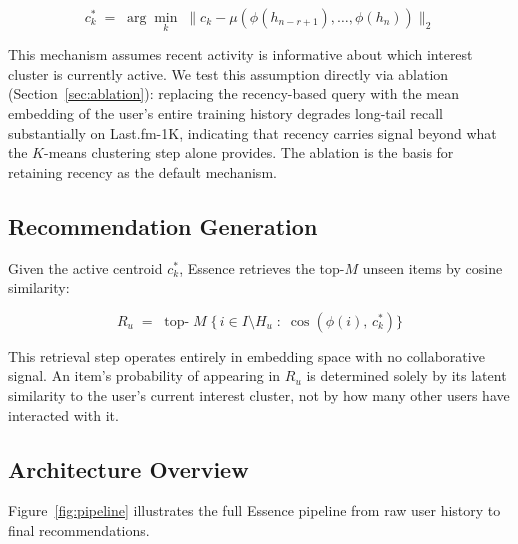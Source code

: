 \documentclass[11pt,a4paper]{article}
\begin{document}
\begin{equation}
  c_k^* \;=\; \arg\min_k \;\bigl\| c_k - \mu\!\left(\phi(h_{n-r+1}), \ldots, \phi(h_n)\right) \bigr\|_2
  \label{eq:active}
\end{equation}

This mechanism assumes recent activity is informative about which interest
cluster is currently active. We test this assumption directly via ablation
(Section~\ref{sec:ablation}): replacing the recency-based query with the mean
embedding of the user's entire training history degrades long-tail recall
substantially on Last.fm-1K, indicating that recency carries signal
beyond what the $K$-means clustering step alone provides. The ablation is
the basis for retaining recency as the default mechanism.

\subsection{Recommendation Generation}
Given the active centroid $c_k^*$, Essence retrieves the top-$M$ unseen
items by cosine similarity:

\begin{equation}
  R_u \;=\; \operatorname{top-}M\;\bigl\{\, i \in I \setminus H_u \;:\;
  \cos\!\left(\phi(i),\, c_k^*\right) \bigr\}
  \label{eq:reco}
\end{equation}

This retrieval step operates entirely in embedding space with no collaborative
signal. An item's probability of appearing in $R_u$ is determined solely by
its latent similarity to the user's current interest cluster, not by how
many other users have interacted with it.

\subsection{Architecture Overview}

Figure~\ref{fig:pipeline} illustrates the full Essence pipeline from raw user
history to final recommendations.
\end{document}

